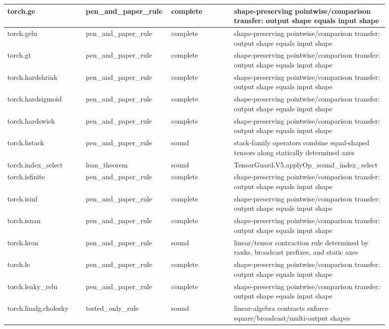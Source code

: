 \documentclass[10pt]{article}
\begin{document}
\begin{longtable}{|p{0.20\linewidth}|p{0.18\linewidth}|p{0.16\linewidth}|p{0.36\linewidth}|}
torch.ge & pen\_and\_paper\_rule & complete & shape-preserving pointwise/comparison transfer: output shape equals input shape \\
\hline
torch.gelu & pen\_and\_paper\_rule & complete & shape-preserving pointwise/comparison transfer: output shape equals input shape \\
\hline
torch.gt & pen\_and\_paper\_rule & complete & shape-preserving pointwise/comparison transfer: output shape equals input shape \\
\hline
torch.hardshrink & pen\_and\_paper\_rule & complete & shape-preserving pointwise/comparison transfer: output shape equals input shape \\
\hline
torch.hardsigmoid & pen\_and\_paper\_rule & complete & shape-preserving pointwise/comparison transfer: output shape equals input shape \\
\hline
torch.hardswish & pen\_and\_paper\_rule & complete & shape-preserving pointwise/comparison transfer: output shape equals input shape \\
\hline
torch.hstack & pen\_and\_paper\_rule & sound & stack-family operators combine equal-shaped tensors along statically determined axes \\
\hline
torch.index\_select & lean\_theorem & sound & TensorGuard.V5.applyOp\_sound\_index\_select \\
\hline
torch.isfinite & pen\_and\_paper\_rule & complete & shape-preserving pointwise/comparison transfer: output shape equals input shape \\
\hline
torch.isinf & pen\_and\_paper\_rule & complete & shape-preserving pointwise/comparison transfer: output shape equals input shape \\
\hline
torch.isnan & pen\_and\_paper\_rule & complete & shape-preserving pointwise/comparison transfer: output shape equals input shape \\
\hline
torch.kron & pen\_and\_paper\_rule & sound & linear/tensor contraction rule determined by ranks, broadcast prefixes, and static axes \\
\hline
torch.le & pen\_and\_paper\_rule & complete & shape-preserving pointwise/comparison transfer: output shape equals input shape \\
\hline
torch.leaky\_relu & pen\_and\_paper\_rule & complete & shape-preserving pointwise/comparison transfer: output shape equals input shape \\
\hline
torch.linalg.cholesky & tested\_only\_rule & sound & linear-algebra contracts enforce square/broadcast/multi-output shapes \\

\end{longtable}
\end{document}
